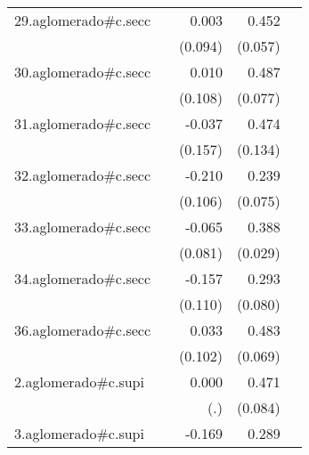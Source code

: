 {\begin{longtable}{l*{4}{D{.}{.}{-1}}}
\addlinespace
29.aglomerado#c.secc&                     &       0.003         &       0.452\sym{***}&                     \\
            &                     &     (0.094)         &     (0.057)         &                     \\
\addlinespace
30.aglomerado#c.secc&                     &       0.010         &       0.487\sym{***}&                     \\
            &                     &     (0.108)         &     (0.077)         &                     \\
\addlinespace
31.aglomerado#c.secc&                     &      -0.037         &       0.474\sym{***}&                     \\
            &                     &     (0.157)         &     (0.134)         &                     \\
\addlinespace
32.aglomerado#c.secc&                     &      -0.210\sym{*}  &       0.239\sym{**} &                     \\
            &                     &     (0.106)         &     (0.075)         &                     \\
\addlinespace
33.aglomerado#c.secc&                     &      -0.065         &       0.388\sym{***}&                     \\
            &                     &     (0.081)         &     (0.029)         &                     \\
\addlinespace
34.aglomerado#c.secc&                     &      -0.157         &       0.293\sym{***}&                     \\
            &                     &     (0.110)         &     (0.080)         &                     \\
\addlinespace
36.aglomerado#c.secc&                     &       0.033         &       0.483\sym{***}&                     \\
            &                     &     (0.102)         &     (0.069)         &                     \\
\addlinespace
2.aglomerado#c.supi&                     &       0.000         &       0.471\sym{***}&                     \\
            &                     &         (.)         &     (0.084)         &                     \\
\addlinespace
3.aglomerado#c.supi&                     &      -0.169         &       0.289\sym{***}&                     \\

\end{longtable}}
